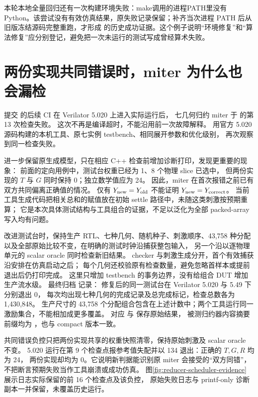 本轮本地全量回归还有一次构建环境失败：make调用的进程PATH里没有Python。该尝试没有有效仿真结果，原失败记录保留；补齐当次进程 PATH 后从旧版冻结源码完整重跑，才形成  的历史成功证据。这个例子说明“环境修复”和“算法修复”应分别登记，避免把一次未运行的测试写成曾经算术失败。

\section{两份实现共同错误时，miter 为什么也会漏检}
提交  的后续 CI 在 Verilator 5.020 上进入实际运行后，
七几何归约 miter 于  的第 13 次检查失败。
这次不再是编译超时，不能沿用前一次故障解释。
用官方 5.020 源码构建的本机工具、原七实例 testbench、相同展开参数和优化级别，
再次观察到同一检查失败。

进一步保留原生成模型，只在相应 C++ 检查前增加诊断打印，发现更重要的现象：
前面的定向用例中，测试台权重已经为 1、8 个物理 slice 已选中，
但两份实现的 \(T\) 与 \(G\) 同时保持 0；独立数学值应为 24。
因此，miter 在首次报错之前已有双方共同偏离正确值的情况。
仅有 \(Y_{\rm new}=Y_{\rm old}\) 不能证明 \(Y_{\rm new}=Y_{\rm correct}\)。
当前工具生成代码把相关总和的赋值放在初始 settle 路径中，未随这类刺激按预期重算；
它是本次具体测试结构与工具组合的证据，不足以泛化为全部 packed-array 写入均有问题。

改进测试台时，保持生产 RTL、七种几何、随机种子、刺激顺序、43,758 种分配
以及全部原始比较不变，在明确的测试时钟沿捕获整包输入，
另一个沿以逐物理单元的 scalar oracle 同时检查新旧结果。
checker 与刺激生成分开，首个有效捕获沿安排在仿真启动之后；
每个几何还校验原有检查数量，避免忽略首样本或提前退出后仍打印完成。
这里只增加 testbench 的事务边界，没有给组合 DUT 增加生产流水级。
最终归档  记录：
修复后的同一测试台在 Verilator 5.020 与 5.49 下分别退出 0，
每次均出现七种几何的完成记录及总完成标记，检查总数各为 1,430,848。
生产尺寸的 43,758 个分配组合包含在上述计数中；两个工具运行同一激励集合，不能相加成更多覆盖。
对应  与  保存原始结果，
被测归约器内容摘要前缀均为 ，也与 compact 版本一致。

共同错误负控只把两份实现共享的权重快照清零，保持原始刺激及 scalar oracle 不变。
5.020 运行在第 9 个检查点报参考值失配并以 134 退出：正确的 \(T,G,R\) 均为 24，
两份实现却均为 0。它说明新判据能识别原 miter 会接受的“双方同错”，
不把断言预期失败当作工具崩溃或成功仿真。
图\ref{fig:reducer-scheduler-evidence} 展示日志实际保留的前 16 个检查点及该负控，
原始失败日志与 printf-only 诊断副本一并保留，未覆盖历史运行。

